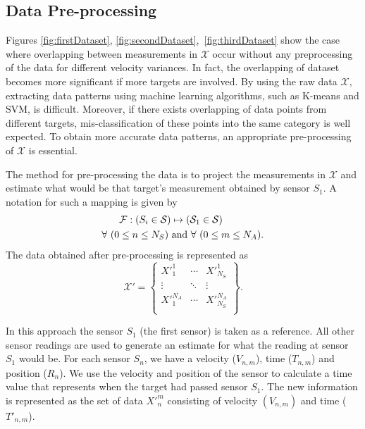 \documentclass[letterpaper, 10 pt, conference]{ieeeconf}
\begin{document}
\subsection{Data Pre-processing}
Figures \ref{fig:firstDataset}, \ref{fig:secondDataset},~\ref{fig:thirdDataset} show the case where overlapping between measurements in $\mathcal{X}$ occur without any preprocessing of the data for different velocity variances. In fact, the overlapping of dataset becomes more significant if more targets are involved. By using the raw data $\mathcal{X}$, extracting data patterns using machine learning algorithms, such as K-means and SVM, is difficult. Moreover, if there exists overlapping of data points from different targets, mis-classification of these points into the same category is well expected. To obtain more accurate data patterns, an appropriate pre-processing of $\mathcal{X}$ is essential.

The method for pre-processing the data is to project the  measurements in $\mathcal{X}$ and estimate what would be that target's measurement obtained by sensor $S_1$. A notation for such a mapping is given by
\begin{align}
&\mathcal{F}:(S_i \in \mathcal{S}) \mapsto (\mathcal{S}_1 \in \mathcal{S})\\
\forall~ (0&\leq n\leq N_S) \textup{ and } \forall~ (0\leq m\leq N_A).\nonumber \label{eq:backmapping}
\end{align}
The data obtained after pre-processing is represented as
\begin{equation} \label{eq:afterPreprocessing}
\mathcal{X'} = \begin{Bmatrix}
{X'}_1^1&\cdots&{X'}_{N_S}^1\\
\vdots&\ddots&\vdots\\
{X'}_1^{N_A}&\cdots&{X'}_{N_S}^{N_A}\\
\end{Bmatrix}.
\end{equation}

In this approach the sensor $S_1$ (the first sensor) is taken as a reference. All other sensor readings are used to generate an estimate for what the reading at sensor $S_1$ would be. For each sensor $S_{n}$, we have a velocity ($V_{n,m}$), time ($T_{n,m}$) and position ($R_n$). We use the velocity and position of the sensor to calculate a time value that represents when the target had passed sensor $S_1$. The new information is represented as the set of data ${X'}_n^m$ consisting of velocity $(V_{n,m})$ and time (${T'}_{n,m}$). 
\end{document}
